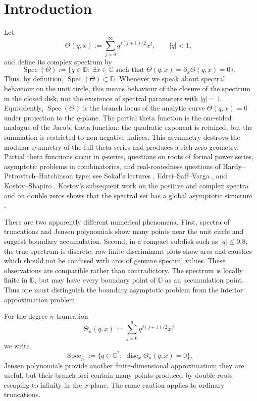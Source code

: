 \documentclass[11pt,a4paper,reqno]{amsart}
\theoremstyle{remark}
\newcommand{\C}{\mathbb C}
\newcommand{\D}{\mathbb D}
\newcommand{\Spec}{\operatorname{Spec}}
\newcommand{\disc}{\operatorname{disc}}
\begin{document}
\section{Introduction}
Let
\[
        \Theta(q,x):=\sum_{j=0}^{\infty}q^{j(j+1)/2}x^j,
        \qquad |q|<1,
\]
and define its complex spectrum by
\[
        \Spec(\Theta):=\{q\in\D:\ \exists x\in\C\text{ such that }
        \Theta(q,x)=\partial_x\Theta(q,x)=0\}.
\]
Thus, by definition, \(\Spec(\Theta)\subset\D\).  Whenever we speak about spectral behaviour on the unit circle, this means behaviour of the closure of the spectrum in the closed disk, not the existence of spectral parameters with \(|q|=1\).
Equivalently, \(\Spec(\Theta)\) is the branch locus of the analytic curve \(\Theta(q,x)=0\) under projection to the \(q\)-plane.  The partial theta function is the one-sided analogue of the Jacobi theta function: the quadratic exponent is retained, but the summation is restricted to non-negative indices.  This asymmetry destroys the modular symmetry of the full theta series and produces a rich zero geometry.  Partial theta functions occur in \(q\)-series, questions on roots of formal power series, asymptotic problems in combinatorics, and real-rootedness questions of Hardy--Petrovitch--Hutchinson type; see Sokal's lectures \cite{SokalNotes}, Edrei--Saff--Varga \cite{EdreiSaffVarga}, and Kostov--Shapiro \cite{KostovShapiro}.  Kostov's subsequent work on the positive and complex spectra and on double zeros shows that the spectral set has a global asymptotic structure \cite{KostovAsymptotics,KostovSpectrum,KostovDoubleZeros}.

There are two apparently different numerical phenomena.  First, spectra of truncations and Jensen polynomials show many points near the unit circle and suggest boundary accumulation.  Second, in a compact subdisk such as \(|q|\leq0.8\), the true spectrum is discrete; raw finite discriminant plots show arcs and caustics which should not be confused with arcs of genuine spectral values.  These observations are compatible rather than contradictory.  The spectrum is locally finite in \(\D\), but may have every boundary point of \(\D\) as an accumulation point.  Thus one must distinguish the boundary asymptotic problem from the interior approximation problem.

For the degree \(n\) truncation
\[
        \Theta_n(q,x):=\sum_{j=0}^{n}q^{j(j+1)/2}x^j
\]
we write
\[
        \Spec_n:=\{q\in\C^*:\ \disc_x\Theta_n(q,x)=0\}.
\]
Jensen polynomials provide another finite-dimensional approximation; they are useful, but their branch loci contain many points produced by double roots escaping to infinity in the \(x\)-plane.  The same caution applies to ordinary truncations.
\end{document}
